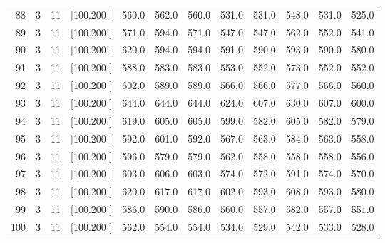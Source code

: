 \documentclass[12pt,a4paper]{article}
\begin{document}
\begin{center}
{\begin{tabular}{r r r r r r r r r r r r}
  88&  3& 11&[100.200   ]&   560.0&   562.0&   560.0&   531.0&   531.0&   548.0&   531.0&   525.0\\[-0.02in]
  89&  3& 11&[100.200   ]&   571.0&   594.0&   571.0&   547.0&   547.0&   562.0&   552.0&   541.0\\[-0.02in]
  90&  3& 11&[100.200   ]&   620.0&   594.0&   594.0&   591.0&   590.0&   593.0&   590.0&   580.0\\[-0.02in]
  91&  3& 11&[100.200   ]&   588.0&   583.0&   583.0&   553.0&   552.0&   573.0&   552.0&   552.0\\[-0.02in]
  92&  3& 11&[100.200   ]&   602.0&   589.0&   589.0&   566.0&   566.0&   577.0&   566.0&   560.0\\[-0.02in]
  93&  3& 11&[100.200   ]&   644.0&   644.0&   644.0&   624.0&   607.0&   630.0&   607.0&   600.0\\[-0.02in]
  94&  3& 11&[100.200   ]&   619.0&   605.0&   605.0&   599.0&   582.0&   605.0&   582.0&   579.0\\[-0.02in]
  95&  3& 11&[100.200   ]&   592.0&   601.0&   592.0&   567.0&   563.0&   584.0&   563.0&   558.0\\[-0.02in]
  96&  3& 11&[100.200   ]&   596.0&   579.0&   579.0&   562.0&   558.0&   558.0&   558.0&   556.0\\[-0.02in]
  97&  3& 11&[100.200   ]&   603.0&   606.0&   603.0&   574.0&   572.0&   591.0&   574.0&   570.0\\[-0.02in]
  98&  3& 11&[100.200   ]&   620.0&   617.0&   617.0&   602.0&   593.0&   608.0&   593.0&   580.0\\[-0.02in]
  99&  3& 11&[100.200   ]&   586.0&   590.0&   586.0&   560.0&   557.0&   582.0&   557.0&   551.0\\[-0.02in]
 100&  3& 11&[100.200   ]&   562.0&   554.0&   554.0&   534.0&   529.0&   542.0&   533.0&   528.0\\[-0.02in]

\hline
\end{tabular}}
\end{center}
\end{document}
